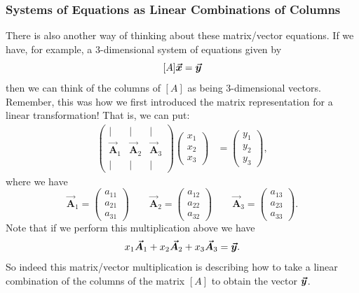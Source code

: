         \subsubsection{Systems of Equations as Linear Combinations of Columns}
        There is also another way of thinking about these matrix/vector equations.  If we have, for example, a 3-dimensional system of equations given by
        \[
        [A]\boldsymbol{\boldsymbol{\vec{x}}} = \boldsymbol{\boldsymbol{\vec{y}}}
        \]
        then we can think of the columns of $[A]$ as being 3-dimensional vectors. Remember, this was how we first introduced the matrix representation for a linear transformation! That is, we can put:
        \begin{align*}
            \begin{pmatrix} \vert & \vert & \vert \\ \boldsymbol{\vec{A}}_1 & \boldsymbol{\vec{A}}_2 & \boldsymbol{\vec{A}}_3 \\ \vert & \vert & \vert \end{pmatrix} \begin{pmatrix} x_1 \\ x_2 \\ x_3 \end{pmatrix} &= \begin{pmatrix} y_1 \\ y_2 \\ y_3 \end{pmatrix},
        \end{align*}
        where we have
        \[
            \boldsymbol{\vec{A}}_1 = \begin{pmatrix} a_{11} \\ a_{21} \\ a_{31} \end{pmatrix} \qquad \boldsymbol{\vec{A}}_2 = \begin{pmatrix} a_{12} \\ a_{22} \\ a_{32} \end{pmatrix} \qquad \boldsymbol{\vec{A}}_3 = \begin{pmatrix} a_{13} \\ a_{23} \\ a_{33} \end{pmatrix}.
        \]
        Note that if we perform this multiplication above we have
        \[
        x_1 \boldsymbol{\vec{A}}_1 +x_2 \boldsymbol{\vec{A}}_2  + x_3 \boldsymbol{\vec{A}}_3 = \boldsymbol{\boldsymbol{\vec{y}}}.
        \]
        So indeed this matrix/vector multiplication is describing how to take a linear combination of the columns of the matrix $[A]$ to obtain the vector $\boldsymbol{\boldsymbol{\vec{y}}}$.  
        
